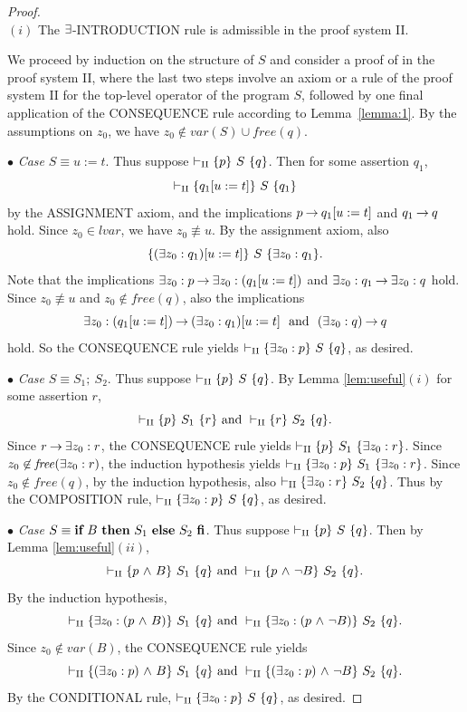 \documentclass[manuscript, screen, review]{acmart}
\begin{document}
\begin{proof}
 \mbox{} \\
 
\NI
$(i)$  The $\mbox{$\exists$}$-{\rm INTRODUCTION} rule is admissible in the proof system {\rm II}.

We proceed by induction on the structure of $S$
and consider a proof of  in the proof system \rm{II}, where 
the last two steps involve an axiom or a rule of the proof system \rm{II} for 
the top-level operator of the program $S$, 
followed by one final application of the CONSEQUENCE rule
according to Lemma~\ref{lemma:1}.
By the assumptions on $z_0$, we have $z_0 \not\in var(S) \cup \mathit{free}(q)$.

\III

\NI
$\bullet$ \emph{Case} $S \equiv u:=t$.
Thus suppose $\vdash_{\rm{II}} \mbox{$\{{p}\}\ {S}\ \{{q}\}$}$.
Then for some assertion $q_1$,
\[
 \vdash_{\rm{II}} \mbox{$\{{q_1[u:=t]}\}\ {S}\ \{{q_1}\}$}
\]
by the ASSIGNMENT axiom,
and the implications 
$p \mbox{$\:\rightarrow\:$} q_1[u:=t]$ and $q_1 \mbox{$\:\rightarrow\:$} q$ hold.
Since $z_0 \in lvar$, we have $z_0 \not \equiv u$. 
By the assignment axiom, also
\[
 \mbox{$\{{(\mbox{$\exists$} z_0:q_1)[u:=t]}\}\ {S}\ \{{\mbox{$\exists$} z_0:q_1}\}$}.
\]
Note that the implications 
$\mbox{$\exists$} z_0:p \mbox{$\:\rightarrow\:$} \mbox{$\exists$} z_0: (q_1[u:=t])$ and $\mbox{$\exists$} z_0: q_1 \mbox{$\:\rightarrow\:$} \mbox{$\exists$} z_0: q$ hold.
Since $z_0 \not \equiv u$ and $z_0 \not\in \mathit{free}(q)$, 
also the implications 
\[
 \mbox{$\exists$} z_0: (q_1[u:=t]) \mbox{$\:\rightarrow\:$} (\mbox{$\exists$} z_0:q_1)[u:=t] \ \mbox{ and }\  (\mbox{$\exists$} z_0:q) \mbox{$\:\rightarrow\:$} q
\] 
hold.
So the CONSEQUENCE rule yields
$\vdash_{\rm{II}}  \mbox{$\{{\mbox{$\exists$} z_0: p}\}\ {S}\ \{{q}\}$}$, as desired.

\III

\NI
$\bullet$ \emph{Case} $S \equiv S_1 ;\ S_2$.
Thus suppose $\vdash_{\rm{II}} \mbox{$\{{p}\}\ {S}\ \{{q}\}$}$.
By Lemma \ref{lem:useful}$(i)$
for some assertion $r$, 
\[
 \vdash_{\rm{II}} \mbox{$\{{p}\}\ {S_1}\ \{{r}\}$}  \mbox{ and }
 \vdash_{\rm{II}} \mbox{$\{{r}\}\ {S_2}\ \{{q}\}$}.
\]
Since $r \mbox{$\:\rightarrow\:$} \mbox{$\exists$} z_0:r$, the CONSEQUENCE rule yields
$\vdash_{\rm{II}}  \mbox{$\{{p}\}\ {S_1}\ \{{\mbox{$\exists$} z_0: r}\}$}$.
Since $z_0 \not \in \mathit{free}(\mbox{$\exists$} z_0: r)$, the induction hypothesis yields
$\vdash_{\rm{II}}  \mbox{$\{{\mbox{$\exists$} z_0: p}\}\ {S_1}\ \{{\mbox{$\exists$} z_0: r}\}$}$.
Since $z_0 \not\in \mathit{free}(q)$, 
by the induction hypothesis, also $\vdash_{\rm{II}}  \mbox{$\{{\mbox{$\exists$} z_0: r}\}\ {S_2}\ \{{q}\}$}$.
Thus by the COMPOSITION  rule, 
$\vdash_{\rm{II}}  \mbox{$\{{\mbox{$\exists$} z_0: p}\}\ {S}\ \{{q}\}$}$, as desired.


\III

\NI
$\bullet$ \emph{Case} $S \equiv \mbox{$\mbox{{\bf if}\ } {B} \mbox{\ {\bf then}\ } {S_1} \mbox{\ {\bf else}\ } {S_2}\ \mbox{{\bf fi}}$}$.
Thus suppose $\vdash_{\rm{II}} \mbox{$\{{p}\}\ {S}\ \{{q}\}$}$.
Then by Lemma \ref{lem:useful}$(ii)$,
\[
 \vdash_{\rm{II}} \mbox{$\{{p \mbox{$\ \wedge\ $} B}\}\ {S_1}\ \{{q}\}$} \mbox{ and }
 \vdash_{\rm{II}} \mbox{$\{{p \mbox{$\ \wedge\ $} \neg B}\}\ {S_2}\ \{{q}\}$}.
\]
By the induction hypothesis,
\[
 \vdash_{\rm{II}} \mbox{$\{{\mbox{$\exists$} z_0: (p \mbox{$\ \wedge\ $} B)}\}\ {S_1}\ \{{q}\}$}  \mbox{ and }
 \vdash_{\rm{II}} \mbox{$\{{\mbox{$\exists$} z_0: (p \mbox{$\ \wedge\ $} \neg B)}\}\ {S_2}\ \{{q}\}$}.
\]
Since $z_0 \not\in var(B)$, the CONSEQUENCE rule yields
\[
 \vdash_{\rm{II}} \mbox{$\{{(\mbox{$\exists$} z_0: p) \mbox{$\ \wedge\ $} B}\}\ {S_1}\ \{{q}\}$}  \mbox{ and }
 \vdash_{\rm{II}} \mbox{$\{{(\mbox{$\exists$} z_0: p) \mbox{$\ \wedge\ $} \neg B}\}\ {S_2}\ \{{q}\}$}.
\]
By the CONDITIONAL rule,
$\vdash_{\rm{II}} \mbox{$\{{\mbox{$\exists$} z_0: p}\}\ {S}\ \{{q}\}$}$,
as desired.


\end{proof}
\end{document}
